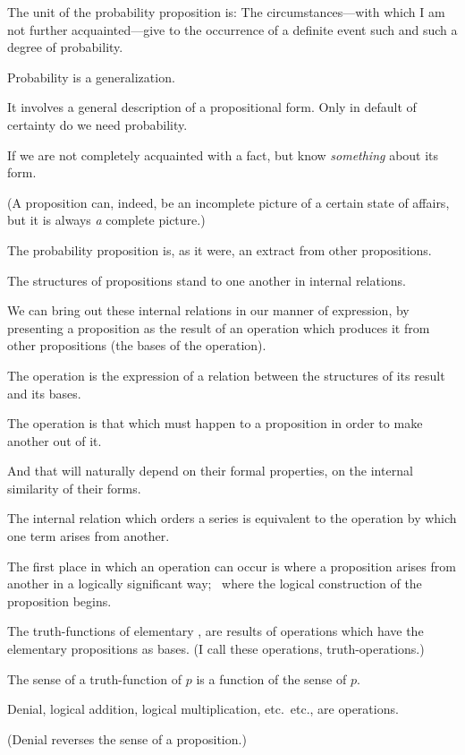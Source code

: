 {The unit of the probability proposition is: The
circumstances---with which I am not further acquainted---give
to the occurrence of a definite event
such and such a degree of probability.}


{Probability is a generalization.

It involves a general description of a propositional
form. Only in default of certainty do we
need probability.

If we are not completely acquainted with a fact,
but know \emph{something} about its form.

(A proposition can, indeed, be an incomplete
picture of a certain state of affairs, but it is always
\emph{a} complete picture.)

The probability proposition is, as it were, an
extract from other propositions.}


{The structures of propositions stand to one
another in internal relations.}


{We can bring out these internal relations in
our manner of expression, by presenting a proposition
as the result of an operation which produces
it from other propositions (the bases of the
operation).}


{The operation is the expression of a relation
between the structures of its result and its
bases.}


{The operation is that which must happen to a
proposition in order to make another out of it.}


{And that will naturally depend on their formal
properties, on the internal similarity of their
forms.}


{The internal relation which orders a series is
equivalent to the operation by which one term
arises from another.}


{The first place in which an operation can occur
is where a proposition arises from another in a
logically significant way; \idEst\ where the logical
construction of the proposition begins.}


{The truth-functions of elementary ,
are results of operations which have the elementary
propositions as bases. (I call these
operations, truth-operations.)}


{The sense of a truth-function of $p$ is a function
of the sense of $p$.

Denial, logical addition, logical multiplication,
etc.\ etc., are operations.

(Denial reverses the sense of a proposition.)}


